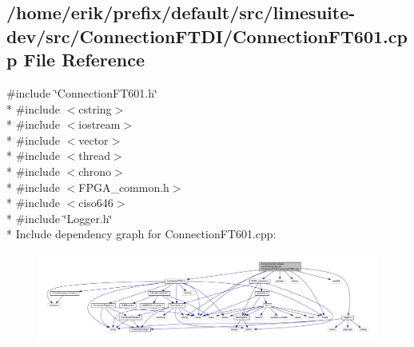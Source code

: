 \subsection{/home/erik/prefix/default/src/limesuite-\/dev/src/\+Connection\+F\+T\+D\+I/\+Connection\+F\+T601.cpp File Reference}
\label{ConnectionFT601_8cpp}
{\ttfamily \#include \char`\"{}Connection\+F\+T601.\+h\char`\"{}}\\*
{\ttfamily \#include $<$cstring$>$}\\*
{\ttfamily \#include $<$iostream$>$}\\*
{\ttfamily \#include $<$vector$>$}\\*
{\ttfamily \#include $<$thread$>$}\\*
{\ttfamily \#include $<$chrono$>$}\\*
{\ttfamily \#include $<$F\+P\+G\+A\+\_\+common.\+h$>$}\\*
{\ttfamily \#include $<$ciso646$>$}\\*
{\ttfamily \#include \char`\"{}Logger.\+h\char`\"{}}\\*
Include dependency graph for Connection\+F\+T601.\+cpp\+:
\nopagebreak
\begin{figure}[H]
\begin{center}
\leavevmode
\includegraphics[width=350pt]{d2/d73/ConnectionFT601_8cpp__incl}
\end{center}
\end{figure}
